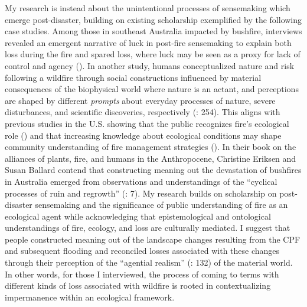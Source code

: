 \documentclass[
]{article}
\begin{document}
My research is instead about the unintentional processes of sensemaking which emerge post-disaster, building on existing scholarship exemplified by the following case studies. Among those in southeast Australia impacted by bushfire, interviews revealed an emergent narrative of luck in post-fire sensemaking to explain both loss during the fire and spared loss, where luck may be seen as a proxy for lack of control and agency (). In another study, humans conceptualized nature and risk following a wildfire through social constructions influenced by material consequences of the biophysical world where nature is an actant, and perceptions are shaped by different \emph{prompts} about everyday processes of nature, severe disturbances, and scientific discoveries, respectively (: 254). This aligns with previous studies in the U.S. showing that the public recognizes fire's ecological role () and that increasing knowledge about ecological conditions may shape community understanding of fire management strategies (). In their book on the alliances of plants, fire, and humans in the Anthropocene, Christine Eriksen and Susan Ballard contend that constructing meaning out the devastation of bushfires in Australia emerged from observations and understandings of the ``cyclical processes of ruin and regrowth'' (: 7). My research builds on scholarship on post-disaster sensemaking and the significance of public understanding of fire as an ecological agent while acknowledging that epistemological and ontological understandings of fire, ecology, and loss are culturally mediated. I suggest that people constructed meaning out of the landscape changes resulting from the CPF and subsequent flooding and reconciled losses associated with these changes through their perception of the ``agential realism'' (: 132) of the material world. In other words, for those I interviewed, the process of coming to terms with different kinds of loss associated with wildfire is rooted in contextualizing impermanence within an ecological framework.
\end{document}
